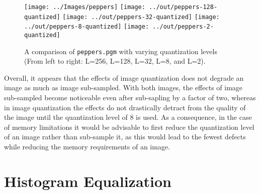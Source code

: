 \documentclass[headings=optiontoheadandtoc,listof=totoc,parskip=full]{scrartcl}
\begin{document}
\begin{figure}[ht]
	\centering
	\texttt{[image: ../Images/peppers]}
	\texttt{[image: ../out/peppers-128-quantized]}
	\texttt{[image: ../out/peppers-32-quantized]}
	\texttt{[image: ../out/peppers-8-quantized]}
	\texttt{[image: ../out/peppers-2-quantized]}
	\caption{A comparison of \texttt{peppers.pgm} with varying quantization levels (From left to right: L=256, L=128, L=32, L=8, and L=2).}
	\label{fig:quantize-result-2}
\end{figure}

Overall, it appears that the effects of image quantization does not degrade an image as much as image sub-sampled. With both images, the effects of image sub-sampled become noticeable even after sub-sapling by a factor of two, whereas in image quantization the effects do not drastically detract from the quality of the image until the quantization level of 8 is used. As a consequence, in the case of memory limitations it would be advisable to first reduce the quantization level of an image rather than sub-sample it, as this would lead to the fewest defects while reducing the memory requirements of an image.

\section{Histogram Equalization}
\end{document}
